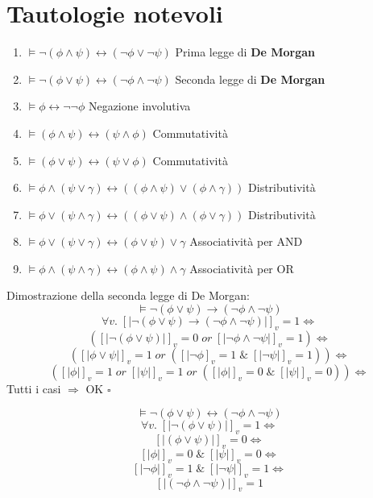 \documentclass{article}
\theoremstyle{break}
\theoremstyle{break}
\theoremstyle{break}
\theoremstyle{break}
\begin{document}
\section{Tautologie notevoli}
\begin{enumerate}
    \item \( \models \neg (\phi \wedge \psi) \leftrightarrow (\neg \phi \vee \neg \psi) \) Prima legge di \textbf{De Morgan}
    \item \( \models \neg (\phi \vee \psi) \leftrightarrow (\neg \phi \wedge \neg \psi) \) Seconda legge di \textbf{De Morgan}
    \item \( \models \phi \leftrightarrow \neg \neg \phi \) Negazione involutiva
    \item \( \models (\phi \wedge \psi) \leftrightarrow (\psi \wedge \phi) \)  Commutatività
    \item \( \models (\phi \vee \psi) \leftrightarrow (\psi \vee \phi) \) Commutatività
    \item \( \models \phi \wedge (\psi \vee \gamma) \leftrightarrow ((\phi \wedge \psi) \vee (\phi \wedge \gamma)) \) Distributività
    \item \( \models \phi \vee (\psi \wedge \gamma) \leftrightarrow ((\phi \vee \psi) \wedge (\phi \vee \gamma)) \) Distributività
    \item \( \models \phi \vee (\psi \vee \gamma) \leftrightarrow (\phi \vee \psi) \vee \gamma \) Associatività per AND
    \item \( \models \phi \wedge (\psi \wedge \gamma) \leftrightarrow (\phi \wedge \psi) \wedge \gamma \) Associatività per OR
\end{enumerate}

\begin{exercise}
    Dimostrazione della seconda legge di De Morgan:
    \[
    \models \neg (\phi \vee \psi) \to (\neg \phi \wedge \neg \psi)
    \] 
    \[
        \forall v.\; [|\neg(\phi \vee \psi) \to (\neg \phi \wedge \neg \psi)|]_v=1 \Leftrightarrow
    \] 
    \[
        ([|\neg (\phi \vee \psi)|]_v=0\; or\; [|\neg \phi \wedge \neg \psi|]_v=1) \Leftrightarrow
    \] 
    \[
        ([|\phi \vee \psi|]_v = 1 \;or\; ([|\neg \phi]_v=1\; \&\; [|\neg \psi|]_v=1)) \Leftrightarrow
    \] 
    \[
        ([|\phi|]_v=1\;or\;[|\psi|]_v=1\;or\;( [|\phi|]_v=0\; \&\; [|\psi|]_v=0)) \Leftrightarrow
    \] 
    Tutti i casi \( \Rightarrow \) OK \( \square \)  
\end{exercise}

\begin{figure}[H]
    \begin{exercise}
        \[
            \models \neg (\phi \vee \psi) \leftrightarrow (\neg \phi \wedge \neg \psi)
        \] 
        \[
            \forall v.\; [|\neg (\phi \vee \psi)|]_v=1 \Leftrightarrow
        \] 
        \[
            [|(\phi \vee \psi)|]_v=0 \Leftrightarrow
        \] 
        \[
            [|\phi|]_v=0\; \&\; [|\psi|]_v=0 \Leftrightarrow
        \] 
        \[
            [|\neg \phi|]_v=1 \; \&\; [|\neg \psi|]_v=1 \Leftrightarrow
        \] 
        \[
            [|(\neg \phi \wedge \neg \psi)|]_v=1
        \] 
    \end{exercise}
\end{figure}
\end{document}
